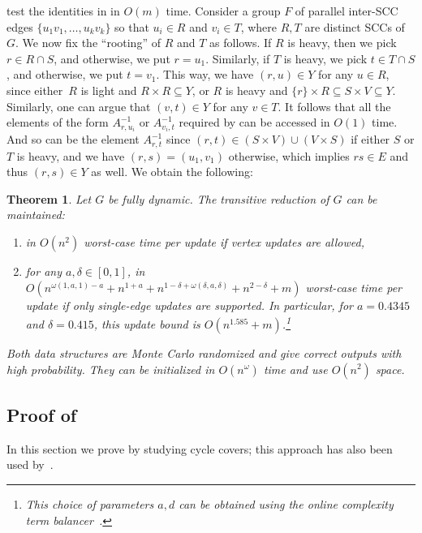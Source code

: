 \documentclass[11pt]{article}
\newtheorem{theorem}{Theorem}[section]
\begin{document}
{test the identities in  in $O(m)$ time.
Consider a group $F$ of parallel inter-SCC edges $\{u_1v_1,\ldots,u_kv_k\}$
so that $u_i\in R$ and $v_i\in T$, where $R,T$ are distinct SCCs of $G$.
We now fix the ``rooting'' of $R$ and $T$ as follows.
If $R$ is heavy, then we pick $r\in R\cap S$, and otherwise, we put $r=u_1$.
Similarly, if $T$ is heavy, we pick $t\in T\cap S$, and otherwise, we put $t=v_1$.
This way, we have $(r,u)\in Y$ for any $u\in R$, since either\
$R$ is light and $R\times R\subseteq Y$, or $R$ is heavy and $\{r\}\times R\subseteq S\times V\subseteq Y$.
Similarly, one can argue that $(v,t)\in Y$ for any $v\in T$.
It follows that all the elements of the form $A^{-1}_{r,u_i}$
or $A^{-1}_{v_i,t}$ required by  can be accessed in $O(1)$ time. And so can be the element $A^{-1}_{r,t}$ since $(r,t)\in (S\times V)\cup (V\times S)$
if either $S$ or $T$ is heavy, and we have $(r,s)=(u_1,v_1)$ otherwise,
which implies $rs\in E$ and thus $(r,s)\in Y$ as well.
We obtain the following:
\begin{theorem}\label{thm:algebraic-general}
    Let $G$ be fully dynamic. The transitive reduction of $G$ can be maintained:
    \begin{enumerate}[label=(\arabic*)]
        \item in $O(n^2)$ worst-case time per update if vertex updates are allowed,
        \item for any $a,\delta\in [0,1]$, in $O(n^{\omega(1,a,1)-a}+n^{1+a}+n^{1-\delta+\omega(\delta,a,\delta)}+n^{2-\delta}+m)$ worst-case time per update if only single-edge updates are supported. In particular, for $a=0.4345$
        and $\delta=0.415$, this update bound is $O(n^{1.585}+m)$.\footnote{This choice of parameters $a,d$ can be obtained using the online complexity term balancer~\cite{Complexity}.}
    \end{enumerate}
    Both data structures are Monte Carlo randomized and give correct outputs with high probability.
    They can be initialized in $O(n^\omega)$ time and use $O(n^2)$ space.
\end{theorem}

\subsection{Proof of }\label{s:redundant-algebraic}
In this section we prove \Cref{t:tr-matrix}
by studying cycle covers; this approach has also been used by~\cite{Sankowski04}.

}
\end{document}
